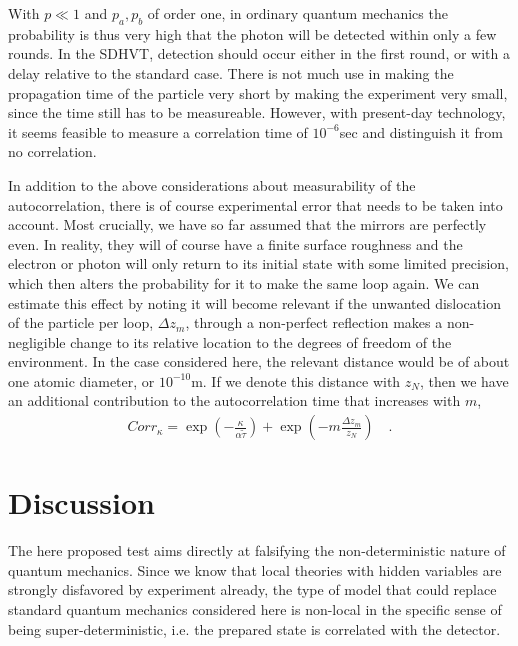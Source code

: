 \documentclass{svjour2}                    %
\newcommand{\beqn}{\begin{eqnarray}}
\newcommand{\eeqn}{\end{eqnarray}}
\begin{document}
With $p\ll 1$ and $p_a, p_b$ of order one, in ordinary quantum mechanics the probability
is thus very high that the photon will be detected within only a few rounds. In 
the {\sc SDHVT}, detection should occur either in the first round,
or with a delay relative to the standard case. There is not much
use in making the propagation time of the particle very short by
making the experiment very small, since the time still has to be
measureable. However, with present-day technology, it seems feasible
to measure a correlation time of $10^{-6}$sec and distinguish it
from no correlation.

In addition to the above considerations about measurability of the autocorrelation,
there is of course experimental error that needs to be taken into account. Most
crucially, we have so far assumed that the mirrors are perfectly even. In reality, they
will of course have a finite surface roughness and the electron or photon will only return
to its initial state with some limited precision, which then alters the 
probability for it to make the same loop again. We can estimate this effect by
noting it will become relevant if the unwanted dislocation of the particle per loop, 
$\Delta z_m$,  
through a non-perfect reflection makes a non-negligible change to its relative 
location to the degrees of freedom of the environment. In the case considered
here, the relevant distance would be of about one atomic diameter, or $10^{-10}$m.
If we denote this distance with $z_N$, then we have an additional contribution
to the autocorrelation time that increases with $m$,
\beqn
Corr_{\kappa} = \exp \left( - \frac{\kappa}{\alpha \tilde \tau} \right) + \exp \left(- m \frac{\Delta z_m}{z_N} \right) \quad.
\eeqn

\section{Discussion}

The here proposed test aims directly at falsifying the non-deterministic nature
of quantum mechanics. Since we know that local theories with hidden variables 
are strongly disfavored by experiment already, the type of model that could replace
standard quantum mechanics considered here is non-local in
the specific sense of being super-deterministic, i.e. the prepared state
is correlated with the detector. 
\end{document}
